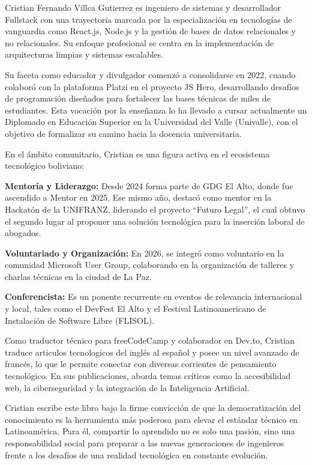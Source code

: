 \documentclass[
  letterpaper,
  DIV=11,
  numbers=noendperiod]{scrreprt}
\begin{document}
Cristian Fernando Villca Gutierrez es ingeniero de sistemas y
desarrollador Fullstack con una trayectoria marcada por la
especialización en tecnologías de vanguardia como React.js, Node.js y la
gestión de bases de datos relacionales y no relacionales. Su enfoque
profesional se centra en la implementación de arquitecturas limpias y
sistemas escalables.

Su faceta como educador y divulgador comenzó a consolidarse en 2022,
cuando colaboró con la plataforma Platzi en el proyecto JS Hero,
desarrollando desafíos de programación diseñados para fortalecer las
bases técnicas de miles de estudiantes. Esta vocación por la enseñanza
lo ha llevado a cursar actualmente un Diplomado en Educación Superior en
la Universidad del Valle (Univalle), con el objetivo de formalizar su
camino hacia la docencia universitaria.

En el ámbito comunitario, Cristian es una figura activa en el ecosistema
tecnológico boliviano:

\textbf{Mentoría y Liderazgo:} Desde 2024 forma parte de GDG El Alto,
donde fue ascendido a Mentor en 2025. Ese mismo año, destacó como mentor
en la Hackatón de la UNIFRANZ, liderando el proyecto ``Futuro Legal'',
el cual obtuvo el segundo lugar al proponer una solución tecnológica
para la inserción laboral de abogados.

\textbf{Voluntariado y Organización:} En 2026, se integró como
voluntario en la comunidad Microsoft User Group, colaborando en la
organización de talleres y charlas técnicas en la ciudad de La Paz.

\textbf{Conferencista:} Es un ponente recurrente en eventos de
relevancia internacional y local, tales como el DevFest El Alto y el
Festival Latinoamericano de Instalación de Software Libre (FLISOL).

Como traductor técnico para freeCodeCamp y colaborador en Dev.to,
Cristian traduce articulos tecnologicos del inglés al español y posee un
nivel avanzado de francés, lo que le permite conectar con diversas
corrientes de pensamiento tecnológico. En sus publicaciones, aborda
temas críticos como la accesibilidad web, la ciberseguridad y la
integración de la Inteligencia Artificial.

Cristian escribe este libro bajo la firme convicción de que la
democratización del conocimiento es la herramienta más poderosa para
elevar el estándar técnico en Latinoamérica. Para él, compartir lo
aprendido no es solo una pasión, sino una responsabilidad social para
preparar a las nuevas generaciones de ingenieros frente a los desafíos
de una realidad tecnológica en constante evolución.
\end{document}
